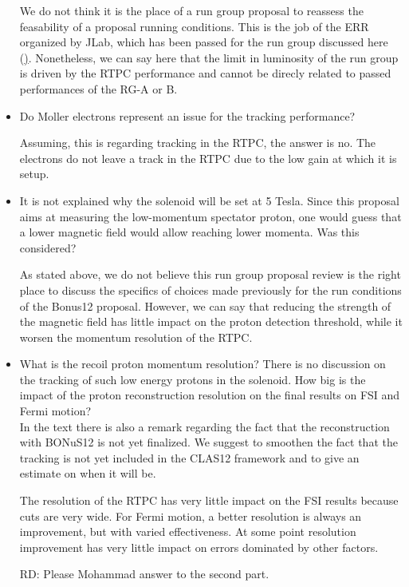 \begin{itemize}
{\color{red} We do not think it is the place of a run group proposal to reassess the feasability of a proposal running
conditions. This is the job of the ERR organized by JLab, which has been passed for the run group discussed
here (\href{}). Nonetheless, we can say here that the limit in luminosity of the run group is driven by the
RTPC performance and cannot be direcly related to passed performances of the RG-A or B.}

 \item Do Moller electrons represent an issue for the tracking performance? 

{\color{red} Assuming, this is regarding tracking in the RTPC, the answer is no. The electrons do not leave a track in the
RTPC due to the low gain at which it is setup.}

 \item It is not explained why the solenoid will be set at 5 Tesla. Since this proposal aims at measuring the low-momentum spectator proton, one would guess that a lower magnetic field would allow reaching lower momenta. Was this considered?
 
{\color{red} As stated above, we do not believe this run group proposal review is the right place to discuss the specifics of 
choices made previously for the run conditions of the Bonus12 proposal. However, we can say that reducing the 
strength of the magnetic field has little impact on the proton detection threshold, while it worsen the momentum
resolution of the RTPC.}

 \item What is the recoil proton momentum resolution? There is no discussion on the tracking of such low energy protons in the solenoid. How big is the impact of the proton reconstruction resolution on the final results on FSI and Fermi motion?
 \\In the text there is also a remark regarding the fact that the reconstruction with BONuS12 is not yet finalized. We suggest to smoothen the fact that the tracking is not yet included in the CLAS12 framework and to give an estimate on when it will be.
 
{\color{red} The resolution of the RTPC has very little impact on the FSI results because cuts are very wide. For Fermi
motion, a better resolution is always an improvement, but with varied effectiveness. At some point resolution 
improvement has very little impact on errors dominated by other factors.

RD: Please Mohammad answer to the second part.}


\end{itemize}

